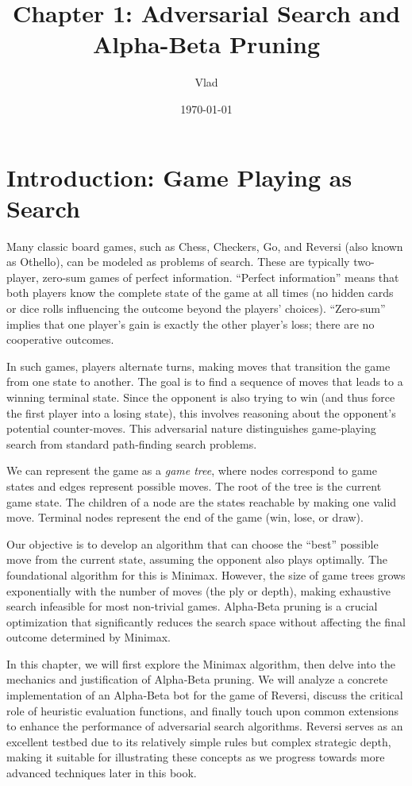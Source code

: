 \documentclass[11pt]{article}
\title{Chapter 1: Adversarial Search and Alpha-Beta Pruning}
\author{Vlad}
\date{\today}
\begin{document}
\maketitle

\section{Introduction: Game Playing as Search}
Many classic board games, such as Chess, Checkers, Go, and Reversi (also known as Othello), can be modeled as problems of search. These are typically two-player, zero-sum games of perfect information. “Perfect information” means that both players know the complete state of the game at all times (no hidden cards or dice rolls influencing the outcome beyond the players’ choices). “Zero-sum” implies that one player’s gain is exactly the other player’s loss; there are no cooperative outcomes.

In such games, players alternate turns, making moves that transition the game from one state to another. The goal is to find a sequence of moves that leads to a winning terminal state. Since the opponent is also trying to win (and thus force the first player into a losing state), this involves reasoning about the opponent’s potential counter-moves. This adversarial nature distinguishes game‑playing search from standard path‑finding search problems.

We can represent the game as a \textit{game tree}, where nodes correspond to game states and edges represent possible moves. The root of the tree is the current game state. The children of a node are the states reachable by making one valid move. Terminal nodes represent the end of the game (win, lose, or draw).

Our objective is to develop an algorithm that can choose the “best” possible move from the current state, assuming the opponent also plays optimally. The foundational algorithm for this is Minimax. However, the size of game trees grows exponentially with the number of moves (the ply or depth), making exhaustive search infeasible for most non-trivial games. Alpha‑Beta pruning is a crucial optimization that significantly reduces the search space without affecting the final outcome determined by Minimax.

In this chapter, we will first explore the Minimax algorithm, then delve into the mechanics and justification of Alpha‑Beta pruning. We will analyze a concrete implementation of an Alpha‑Beta bot for the game of Reversi, discuss the critical role of heuristic evaluation functions, and finally touch upon common extensions to enhance the performance of adversarial search algorithms. Reversi serves as an excellent testbed due to its relatively simple rules but complex strategic depth, making it suitable for illustrating these concepts as we progress towards more advanced techniques later in this book.
\end{document}
